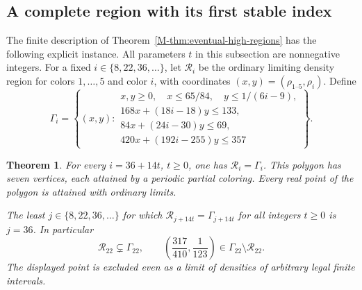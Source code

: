 \documentclass[11pt,reqno]{amsart}
\theoremstyle{plain}
\newtheorem{theorem}{Theorem}
\theoremstyle{plain}
\theoremstyle{plain}
\begin{document}
\subsection{A complete region with its first stable index}
\label{M-sec:cr-residue8}

The finite description of Theorem~\ref{M-thm:eventual-high-regions}
has the following explicit instance. All parameters $t$ in this
subsection are nonnegative integers. For a fixed
$i\in\{8,22,36,\ldots\}$, let $\mathcal R_i$ be the ordinary
limiting density region for colors $1,\ldots,5$ and color $i$,
with coordinates $(x,y)=(\rho_{1\text{--}5},\rho_i)$. Define
\begin{equation}\label{M-eq:cr-residue8-polygon}
 \Gamma_i=\left\{(x,y):
 \begin{array}{l}
 x,y\ge0,\quad x\le65/84,\quad y\le1/(6i-9),\\
 168x+(18i-18)y\le133,\\
 84x+(24i-30)y\le69,\\
 420x+(192i-255)y\le357
 \end{array}\right\}.
\end{equation}

\begin{theorem}\label{M-thm:cr-residue8}
For every $i=36+14t$, $t\ge0$, one has
$\mathcal R_i=\Gamma_i$. This polygon has seven vertices, each
attained by a periodic partial coloring. Every real point of the
polygon is attained with ordinary limits.

The least $j\in\{8,22,36,\ldots\}$ for which
$\mathcal R_{j+14t}=\Gamma_{j+14t}$ for all integers $t\ge0$ is
$j=36$. In particular
\[
 \mathcal R_{22}\subsetneq\Gamma_{22},\qquad
 \left(\frac{317}{410},\frac1{123}\right)
          \in\Gamma_{22}\setminus\mathcal R_{22}.
\]
The displayed point is excluded even as a limit of densities of
arbitrary legal finite intervals.
\end{theorem}
\end{document}
